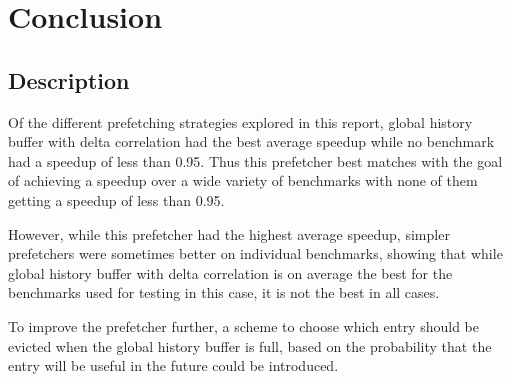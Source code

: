 \section{Conclusion}
\label{sec:conclusion}
\subsection{Description}

Of the different prefetching strategies explored in this report,
global history buffer with delta correlation had the best average
speedup while no benchmark had a speedup of less than 0.95. Thus
this prefetcher best matches with the goal of achieving a speedup
over a wide variety of benchmarks with none of them getting a
speedup of less than 0.95.

However, while this prefetcher had the highest average
speedup, simpler prefetchers were sometimes better on
individual benchmarks, showing that while global history buffer
with delta correlation is on average the best for the benchmarks
used for testing in this case, it is not the best in all cases.

To improve the prefetcher further, a scheme to choose which
entry should be evicted when the global history buffer is full,
based on the probability that the entry will be useful in the
future could be introduced.
